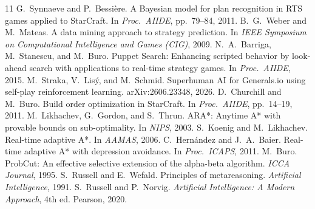 \begin{thebibliography}{11}
 G.~Synnaeve and P.~Bessi\`ere. A Bayesian model for plan recognition in RTS games applied to
StarCraft. In \emph{Proc.\ AIIDE}, pp.~79--84, 2011.
 B.~G.~Weber and M.~Mateas. A data mining approach to strategy prediction. In \emph{IEEE Symposium
on Computational Intelligence and Games (CIG)}, 2009.
 N.~A.~Barriga, M.~Stanescu, and M.~Buro. Puppet Search: Enhancing scripted behavior by
look-ahead search with applications to real-time strategy games. In \emph{Proc.\ AIIDE}, 2015.
 M.~Straka, V.~Lis\'y, and M.~Schmid. Superhuman AI for Generals.io using self-play reinforcement
learning. arXiv:2606.23348, 2026.
 D.~Churchill and M.~Buro. Build order optimization in StarCraft. In \emph{Proc.\ AIIDE},
pp.~14--19, 2011.
 M.~Likhachev, G.~Gordon, and S.~Thrun. ARA*: Anytime A* with provable bounds on sub-optimality. In
\emph{NIPS}, 2003.
 S.~Koenig and M.~Likhachev. Real-time adaptive A*. In \emph{AAMAS}, 2006.
 C.~Hern\'andez and J.~A.~Baier. Real-time adaptive A* with depression avoidance. In
\emph{Proc.\ ICAPS}, 2011.
 M.~Buro. ProbCut: An effective selective extension of the alpha-beta algorithm. \emph{ICCA
Journal}, 1995.
 S.~Russell and E.~Wefald. Principles of metareasoning. \emph{Artificial Intelligence}, 1991.
 S.~Russell and P.~Norvig. \emph{Artificial Intelligence: A Modern Approach}, 4th ed. Pearson,
2020.
\end{thebibliography}
